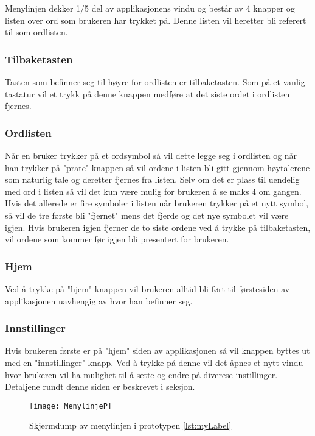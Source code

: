 Menylinjen dekker 1/5 del av applikasjonens vindu og består av 4 knapper og listen over ord som brukeren har trykket på. Denne listen vil heretter bli referert til som ordlisten.

\subsubsection{Tilbaketasten}

Tasten som befinner seg til høyre for ordlisten er tilbaketasten. Som på et vanlig tastatur vil et trykk på denne knappen medføre at det siste ordet i ordlisten fjernes.

\subsubsection{Ordlisten}

Når en bruker trykker på et ordsymbol så vil dette legge seg i ordlisten og når han trykker på "prate" knappen så vil ordene i listen bli gitt gjennom høytalerene som naturlig tale og deretter fjernes fra listen. Selv om det er plass til uendelig med ord i listen så vil det kun være mulig for brukeren å se maks 4 om gangen.  Hvis det allerede er fire symboler i listen når brukeren trykker på et nytt symbol, så vil de tre første bli "fjernet" mens det fjerde og det nye symbolet vil være igjen. Hvis brukeren igjen fjerner de to siste ordene ved å trykke på tilbaketasten,  vil ordene som kommer før igjen bli presentert for brukeren. 


\subsubsection{Hjem}
Ved å trykke på "hjem" knappen vil brukeren alltid bli ført til førstesiden av applikasjonen uavhengig av hvor han befinner seg. 


\subsubsection{Innstillinger}
Hvis brukeren første er på "hjem" siden av applikasjonen så vil knappen byttes ut med en "innstillinger" knapp. Ved å trykke på denne vil det åpnes et nytt vindu hvor brukeren vil ha mulighet til å sette og endre på diverese instillinger. Detaljene rundt denne siden er beskrevet i seksjon.



\begin{figure}[ht!]
\centering
\texttt{[image: MenylinjeP]}
\caption{Skjermdump av menylinjen i prototypen \ref{lst:myLabel}}
\label{fig:menylinjen}
\end{figure}



